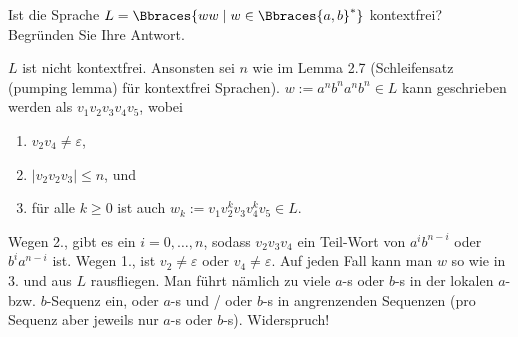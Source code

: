 
\begin{exercise}

Ist die Sprache $L = \Bbraces{w w \mid w \in \Bbraces{a, b}^\ast}$ kontextfrei?
Begründen Sie Ihre Antwort.

\end{exercise}


\begin{solution}

$L$ ist nicht kontextfrei.
Ansonsten sei $n$ wie im Lemma 2.7 (Schleifensatz (pumping lemma) für kontextfrei Sprachen).
$w := a^n b^n a^n b^n \in L$ kann geschrieben werden als $v_1 v_2 v_3 v_4 v_5$, wobei

\begin{enumerate}
    \item $v_2 v_4 \neq \varepsilon$,
    \item $|v_2 v_2 v_3| \leq n$, und
    \item für alle $k \geq 0$ ist auch $w_k := v_1 v_2^k v_3 v_4^k v_5 \in L$.
\end{enumerate}

Wegen 2., gibt es ein $i = 0, \dots, n$, sodass $v_2 v_3 v_4$ ein Teil-Wort von $a^i b^{n-i}$ oder $b^i a^{n-i}$ ist.
Wegen 1., ist $v_2 \neq \varepsilon$ oder $v_4 \neq \varepsilon$.
Auf jeden Fall kann man $w$ so wie in 3.  und aus $L$ rausfliegen.
Man führt nämlich zu viele $a$-s oder $b$-s in der lokalen $a$- bzw. $b$-Sequenz ein, oder $a$-s und / oder $b$-s in angrenzenden Sequenzen (pro Sequenz aber jeweils nur $a$-s oder $b$-s).
Widerspruch!

\end{solution}

